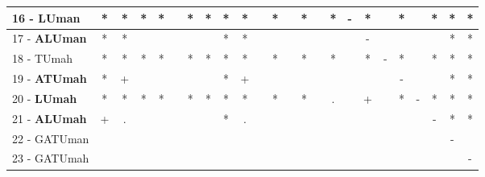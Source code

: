 \begin{table}[h]
\begin{center}
\begin{tabular}{lcc|cc|cc|cc|cc|cc|cc|cc|cc|cc|cc|c}
16 - \textbf{LUman}	& * & * & * & * &   & * & * & * & * &   & * &   & * &   & * & - & * &   & * &   & * & * & * \\ \hline
17 - \textbf{ALUman}	& * & * &   &   &   &   &   & * & * &   &   &   &   &   &   &   & - &   &   &   &   & * & * \\
18 - TUmah	& * & * & * & * &   & * & * & * & * &   & * &   & * &   & * &   & * & - & * &   & * & * & * \\ \hline
19 - \textbf{ATUmah}	& * & + &   &   &   &   &   & * & + &   &   &   &   &   &   &   &   &   & - &   &   & * & * \\
20 - \textbf{LUmah}	& * & * & * & * &   & * & * & * & * &   & * &   & * &   & . &   & + &   & * & - & * & * & * \\ \hline
21 - \textbf{ALUmah}	& + & . &   &   &   &   &   & * & . &   &   &   &   &   &   &   &   &   &   &   & - & * & * \\
22 - GATUman	&   &   &   &   &   &   &   &   &   &   &   &   &   &   &   &   &   &   &   &   &   & - &   \\ \hline
23 - GATUmah	&   &   &   &   &   &   &   &   &   &   &   &   &   &   &   &   &   &   &   &   &   &   & - \\\end{tabular}
\label{stratsALCKappaFriedCIELM}
\end{center}
\end{table}